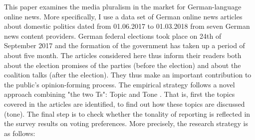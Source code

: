 \documentclass[12pt,a4paper,notitlepage]{article}
\begin{document}
This paper examines the media pluralism in the market for German-language online news. More specifically, I use a data set of German online news articles about domestic politics dated from 01.06.2017 to 01.03.2018 from seven German news content providers. German federal elections took place on 24th of September 2017 and the formation of the government has taken up a period of about five month. The articles considered here thus inform their readers both about the election promises of the parties (before the election) and about the coalition talks (after the election). They thus make an important contribution to the public's opinion-forming process. The empirical strategy follows a novel approach combining "the two Ts": Topic and Tone \citep{hansen_shocking_2016}. That is, first the topics covered in the articles are identified, to find out how these topics are discussed (tone). The final step is to check whether the tonality of reporting is reflected in the survey results on voting preferences. More precisely, the research strategy is as follows:
\end{document}
